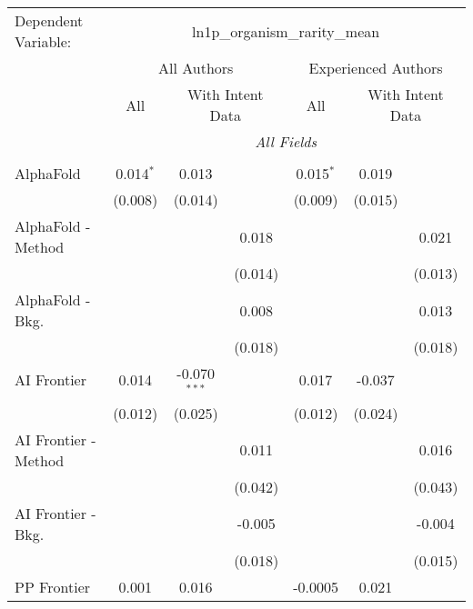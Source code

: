 \begingroup
\centering
\begin{tabular}{lcccccc}
   \tabularnewline \midrule \midrule
   Dependent Variable: & \multicolumn{6}{c}{ln1p\_organism\_rarity\_mean}\\
 & \multicolumn{3}{c}{All Authors} & \multicolumn{3}{c}{Experienced Authors} \\
\cmidrule(lr){2-4} \cmidrule(lr){5-7}
 & \multicolumn{1}{c}{All} & \multicolumn{2}{c}{With Intent Data} & \multicolumn{1}{c}{All} & \multicolumn{2}{c}{With Intent Data} \\
\cmidrule(lr){2-2} \cmidrule(lr){3-4} \cmidrule(lr){5-5} \cmidrule(lr){6-7}
 & \multicolumn{6}{c}{\textit{All Fields}} \\ \\
   AlphaFold            & 0.014$^{*}$ & 0.013          &         & 0.015$^{*}$ & 0.019       &   \\   
                        & (0.008)     & (0.014)        &         & (0.009)     & (0.015)     &   \\   
   AlphaFold - Method   &             &                & 0.018   &             &             & 0.021\\   
                        &             &                & (0.014) &             &             & (0.013)\\   
   AlphaFold - Bkg.     &             &                & 0.008   &             &             & 0.013\\   
                        &             &                & (0.018) &             &             & (0.018)\\   
   AI Frontier          & 0.014       & -0.070$^{***}$ &         & 0.017       & -0.037      &   \\   
                        & (0.012)     & (0.025)        &         & (0.012)     & (0.024)     &   \\   
   AI Frontier - Method &             &                & 0.011   &             &             & 0.016\\   
                        &             &                & (0.042) &             &             & (0.043)\\   
   AI Frontier - Bkg.   &             &                & -0.005  &             &             & -0.004\\   
                        &             &                & (0.018) &             &             & (0.015)\\   
   PP Frontier          & 0.001       & 0.016          &         & -0.0005     & 0.021       &   \\   

\end{tabular}
